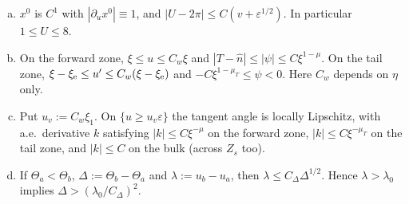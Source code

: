 \begin{lemma}\label{lem:B-curve}
\begin{enumerate}[(a)]\setlength{\itemsep}{1pt}
\item $x^0$ is $C^1$ with $|\partial_ux^0|\equiv1$, and $|U-2\pi|\le C(v+\varepsilon^{1/2})$. In particular $1\le U\le8$.
\item On the forward zone, $\xi\le u\le C_w\xi$ and $|T-\hat n|\le|\psi|\le C\xi^{1-\mu}$. On the tail zone,
$\xi-\xi_{\mathrm{e}}\le u'\le C_w(\xi-\xi_{\mathrm{e}})$ and $-C\xi^{1-\mu_T}\le\psi<0$. Here $C_w$ depends on $\eta$ only.
\item Put $u_v:=C_w\xi_1$. On $\{u\ge u_v\varepsilon\}$ the tangent angle is locally Lipschitz, with a.e.\ derivative $k$ satisfying
$|k|\le C\xi^{-\mu}$ on the forward zone, $|k|\le C\xi^{-\mu_T}$ on the tail zone, and $|k|\le C$ on the bulk (across $Z_s$ too).
\item If $\Theta_a<\Theta_b$, $\Delta:=\Theta_b-\Theta_a$ and $\lambda:=u_b-u_a$, then $\lambda\le C_\Delta\Delta^{1/2}$. Hence $\lambda>\lambda_0$
implies $\Delta>(\lambda_0/C_\Delta)^2$.
\end{enumerate}
\end{lemma}
